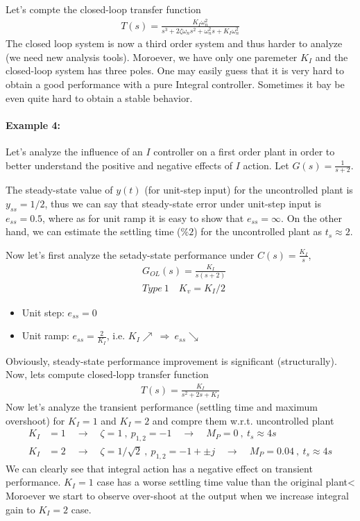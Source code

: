 \documentclass[twoside]{article}
\begin{document}
Let's compte the closed-loop transfer function
%
\begin{align*}
T(s) = \frac{K_I \omega_n^2}{s^3 + 2 \zeta \omega_n s^2 + \omega_n^2 s
  + K_I \omega_n^2}
\end{align*}
The closed loop system is now a third order system and
thus harder to analyze (we need new analysis tools). Moroever, 
we have only one paremeter $K_I$ and the closed-loop system has
three poles. One may easily guess that it is very hard to obtain 
a good performance with a pure Integral controller. 
Sometimes it bay be even quite hard to obtain a stable behavior.

\paragraph{Example 4:} Let's analyze the influence of an $I$ controller on a
first order plant in order to better understand the positive and
negative effects of $I$ action. Let $G(s) = \frac{1}{s+2}$.

The steady-state value of $y(t)$ (for unit-step input)
for the uncontrolled plant is $y_{ss} = 1/2$, thus we 
can say that steady-state error under unit-step input is 
$e_{ss} = 0.5$, where as for unit ramp it is easy to
show that $e_{ss} = \infty$. On the other hand, we can estimate the
settling time ($\%2$) for the uncontrolled plant as $t_{s} \approx 2.$

Now let's first analyze the setady-state performance under 
$C(s) = \frac{K_I}{s}$,
%
\begin{align*}
  &G_{OL}(s) = \frac{K_I }{s (s + 2)}
\\
 &Type \ 1 \quad K_v = K_I / 2
\end{align*}
% 
\begin{itemize}
\item Unit step: $e_{ss} = 0$ 
\item Unit ramp: $e_{ss} = \frac{2}{K_I}$, i.e. $K_I \nearrow \ \Rightarrow \ e_{ss} \searrow$  
\end{itemize}
Obviously, steady-state performance improvement is 
significant (structurally). Now, lets
compute closed-lopp transfer function
%
\begin{align*}
  T(s) = \frac{K_I}{s^2 + 2 s + K_I}
\end{align*}
%
Now let's analyze the transient performance (settling time and maximum
overshoot) for $K_I = 1$ and $K_I = 2$ and compre them
w.r.t. uncontrolled plant
%
\begin{align*}
  K_I &= 1 \quad \rightarrow \quad \zeta = 1 \ , \ p_{1,2} = -1 \quad
        \rightarrow \quad M_P =0 \ , \ t_{s} \approx 4 s
\\
 K_I &= 2 \quad \rightarrow \quad \zeta = 1/\sqrt{2} \ , \ p_{1,2} =
       -1 + \pm j  \quad
        \rightarrow \quad M_P = 0.04 \ , \ t_{s} \approx 4 s
\end{align*}
% 
We can clearly see that integral action has a negative effect 
on transient performance. $K_I = 1$ case has a worse
settling time value than the original plant< 
Moroever we start to observe over-shoot at the output
when we increase integral gain to $K_I = 2$ case.
\end{document}
